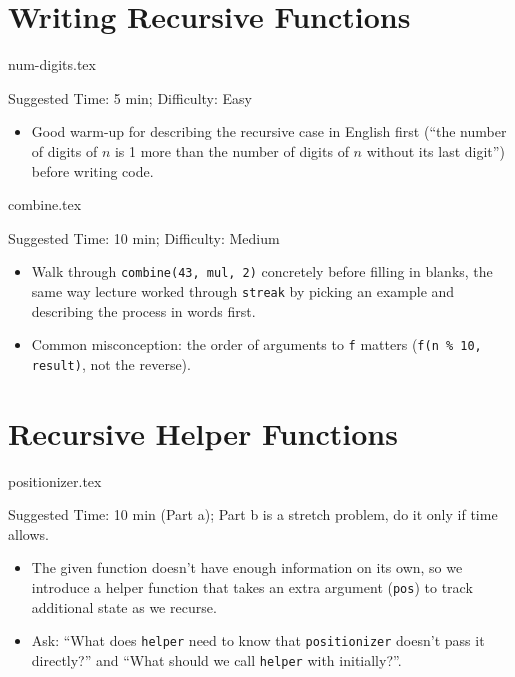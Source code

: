 \documentclass{exam}
\begin{document}
\section{Writing Recursive Functions}
\begin{questions}
    {num-digits.tex}
    \begin{questionmeta}
        Suggested Time: 5 min; Difficulty: Easy
        \begin{itemize}
            \item Good warm-up for describing the recursive case in English first (``the number of digits of $n$ is 1 more than the number of digits of $n$ without its last digit'') before writing code.
        \end{itemize}
    \end{questionmeta}

    {combine.tex}
    \begin{questionmeta}
        Suggested Time: 10 min; Difficulty: Medium
        \begin{itemize}
            \item Walk through \lstinline{combine(43, mul, 2)} concretely before filling in blanks, the same way lecture worked through \lstinline{streak} by picking an example and describing the process in words first.
            \item Common misconception: the order of arguments to \lstinline{f} matters (\lstinline{f(n % 10, result)}, not the reverse).
        \end{itemize}
    \end{questionmeta}
\end{questions}

\section{Recursive Helper Functions}
\begin{questions}
    {positionizer.tex}
    \begin{questionmeta}
        Suggested Time: 10 min (Part a); Part b is a stretch problem, do it only if time allows.
        \begin{itemize}
            \item The given function doesn't have enough information on its own, so we introduce a helper function that takes an extra argument (\lstinline{pos}) to track additional state as we recurse.
            \item Ask: ``What does \lstinline{helper} need to know that \lstinline{positionizer} doesn't pass it directly?'' and ``What should we call \lstinline{helper} with initially?''.
        \end{itemize}
    \end{questionmeta}
\end{questions}
\end{document}

